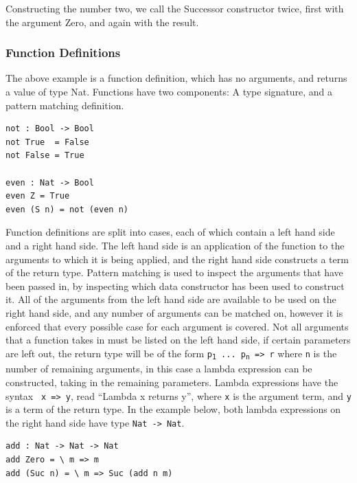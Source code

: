 \documentclass[a4paper]{article}
\begin{document}
Constructing the number two, we call the Successor constructor twice, first with the argument Zero,
and again with the result.

\subsubsection{Function Definitions}
\label{sec:org19c74b8}
The above example is a function definition, which has no arguments,
and returns a value of type Nat. Functions have two components: 
A type signature, and a pattern matching definition.

\begin{center}
\begin{verbatim}
not : Bool -> Bool
not True  = False
not False = True

even : Nat -> Bool
even Z = True
even (S n) = not (even n) 
\end{verbatim}
\end{center}

Function definitions are split into cases, each of which contain 
a left hand side and a right hand side.
The left hand side is an application of the function to the arguments
to which it is being applied, and the right hand side constructs a term
of the return type. Pattern matching is used to inspect the arguments
that have been passed in, by inspecting which data constructor has been
used to construct it. All of the arguments from the left hand side are
available to be used on the right hand side, and any number of arguments
can be matched on, however it is enforced that every possible case for 
each argument is covered. Not all arguments that a function takes in 
must be listed on the left hand side, if certain parameters are left out,
the return type will be of the form \texttt{p\textsubscript{1} ... p\textsubscript{n} => r} where \texttt{n} is the 
number of remaining arguments, in this case a lambda expression can be 
constructed, taking in the remaining parameters. 
Lambda expressions have the syntax \texttt{\ x => y}, read ``Lambda x
returns y'', where \texttt{x} is the argument term, and \texttt{y} is a term of the
return type. In the example below, both lambda expressions on the right
hand side have type \texttt{Nat -> Nat}.

\begin{center}
\begin{verbatim}
add : Nat -> Nat -> Nat
add Zero = \ m => m
add (Suc n) = \ m => Suc (add n m)
\end{verbatim}
\end{center}
\end{document}
